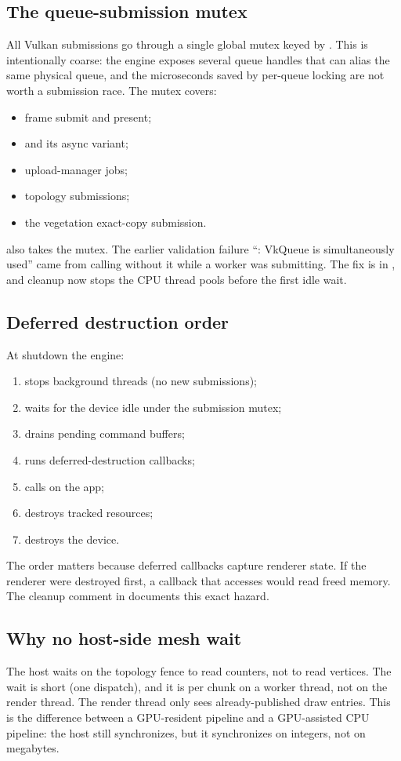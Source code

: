 \subsection{The queue-submission mutex}

All Vulkan submissions go through a single global mutex keyed by
.  This is intentionally coarse: the engine exposes several
queue handles that can alias the same physical queue, and the microseconds
saved by per-queue locking are not worth a submission race.  The mutex
covers:
\begin{itemize}
\item frame submit and present;
\item {} and its async variant;
\item upload-manager jobs;
\item topology submissions;
\item the vegetation exact-copy submission.
\end{itemize}
 also takes the mutex.  The earlier validation
failure ``: VkQueue is simultaneously used'' came from
calling  without it while a worker was submitting.
The fix is in , and cleanup now stops the
CPU thread pools before the first idle wait.

\subsection{Deferred destruction order}

At shutdown the engine:
\begin{enumerate}
\item stops background threads (no new submissions);
\item waits for the device idle under the submission mutex;
\item drains pending command buffers;
\item runs deferred-destruction callbacks;
\item calls  on the app;
\item destroys tracked resources;
\item destroys the device.
\end{enumerate}
The order matters because deferred callbacks capture renderer state.  If
the renderer were destroyed first, a callback that accesses
 would read freed memory.  The cleanup comment in
 documents this exact hazard.

\subsection{Why no host-side mesh wait}

The host waits on the topology fence to read counters, not to read
vertices.  The wait is short (one dispatch), and it is per chunk on a
worker thread, not on the render thread.  The render thread only sees
already-published draw entries.  This is the difference between a
GPU-resident pipeline and a GPU-assisted CPU pipeline: the host still
synchronizes, but it synchronizes on integers, not on megabytes.
